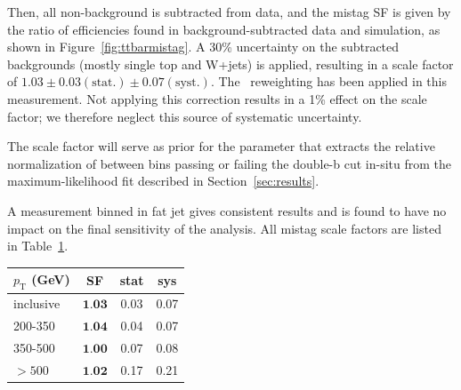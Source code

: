 Then, all non-\ttbar background is subtracted from data, and the mistag SF is given by the ratio of efficiencies found in background-subtracted data and \ttbar simulation, as shown in Figure~\ref{fig:ttbarmistag}. A 30\% uncertainty on the subtracted backgrounds (mostly single top and W+jets) is applied, resulting in a scale factor of $1.03\pm0.03(\text{stat.})\pm0.07(\text{syst.})$. The \ttbar~reweighting has been applied in this measurement. Not applying this correction results in a 1\% effect on the scale factor; we therefore neglect this source of systematic uncertainty. 

The scale factor will serve as prior for the parameter that extracts the relative normalization of \ttbar between bins passing or failing the double-b cut in-situ from the maximum-likelihood fit described in Section~\ref{sec:results}.

A measurement binned in fat jet \pt gives consistent results and is found to have no impact on the final sensitivity of the analysis. All \ttbar mistag scale factors are listed in Table~\ref{tab:Doubleb_FitParameters2}.


\begin{table}[htbH]
  \begin{center}
  \label{tab:Doubleb_FitParameters2}
  \begin{tabular}{  l | c  | c | c  }
  \hline
  \hline
     $p_\text{T}$ (GeV) & \textbf{SF} &stat & sys \\ \midrule
     \hline
inclusive & $\textbf{1.03}$ & 0.03 & 0.07\\ \hline
200-350 & $\textbf{1.04}$ & 0.04 & 0.07\\ \hline
350-500 & $\textbf{1.00}$ & 0.07 & 0.08\\ \hline
$>500$ & $\textbf{1.02}$ & 0.17 & 0.21\\ 
     \hline
     \hline
  \end{tabular}
  \end{center}
\end{table}



